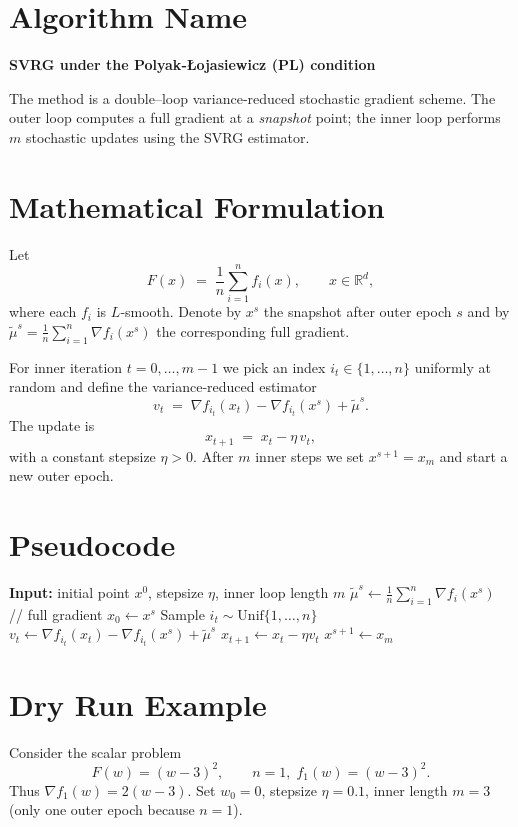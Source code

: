 \documentclass{article}
\newcommand{\grad}{\nabla}
\newcommand{\R}{\mathbb{R}}
\begin{document}
\section*{Algorithm Name}
\textbf{SVRG under the Polyak‑\L{}ojasiewicz (PL) condition}  

The method is a double–loop variance‑reduced stochastic gradient scheme.  
The outer loop computes a full gradient at a \emph{snapshot} point; the inner
loop performs $m$ stochastic updates using the SVRG estimator.

\section*{Mathematical Formulation}
Let  
\[
F(x)\;=\;\frac{1}{n}\sum_{i=1}^{n}f_i(x),\qquad x\in\R^{d},
\]
where each $f_i$ is $L$‑smooth.  
Denote by $x^{s}$ the snapshot after outer epoch $s$ and by
$\widetilde{\mu}^{s}= \frac1n\sum_{i=1}^{n}\grad f_i(x^{s})$ the corresponding
full gradient.

For inner iteration $t=0,\dots,m-1$ we pick an index $i_t\in\{1,\dots,n\}$
uniformly at random and define the variance‑reduced estimator
\[
v_t \;=\; \grad f_{i_t}(x_t)-\grad f_{i_t}(x^{s})+\widetilde{\mu}^{s}.
\]
The update is
\[
x_{t+1}\;=\;x_t-\eta\,v_t,
\]
with a constant stepsize $\eta>0$.  
After $m$ inner steps we set $x^{s+1}=x_m$ and start a new outer epoch.

\section*{Pseudocode}
\begin{algorithm}[H]
\caption{SVRG under PL}
\begin{algorithmic}[1]
\STATE \textbf{Input:} initial point $x^{0}$, stepsize $\eta$, inner loop length $m$
    \STATE $\widetilde{\mu}^{s}\gets \frac{1}{n}\sum_{i=1}^{n}\grad f_i(x^{s})$ \hfill // full gradient
    \STATE $x_{0}\gets x^{s}$
        \STATE Sample $i_t\sim\mathrm{Unif}\{1,\dots,n\}$
        \STATE $v_t \gets \grad f_{i_t}(x_t)-\grad f_{i_t}(x^{s})+\widetilde{\mu}^{s}$
        \STATE $x_{t+1}\gets x_t-\eta v_t$
    \ENDFOR
    \STATE $x^{s+1}\gets x_{m}$
\ENDFOR
\end{algorithmic}
\end{algorithm}

\section*{Dry Run Example}
Consider the scalar problem
\[
F(w)= (w-3)^2,\qquad n=1,\; f_1(w)= (w-3)^2.
\]
Thus $\grad f_1(w)=2(w-3)$.  
Set $w_0=0$, stepsize $\eta=0.1$, inner length $m=3$ (only one outer epoch
because $n=1$).
\end{document}

